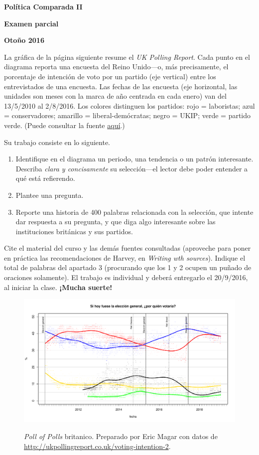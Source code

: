 \documentclass[letter,12pt]{article}
\begin{document}
\textbf{Política Comparada II}

\textbf{Examen parcial}

\textbf{Otoño 2016}

\bigskip

\noindent La gráfica de la página siguiente resume el \emph{UK Polling Report}. Cada punto en el diagrama reporta una encuesta del Reino Unido---o, más precisamente, el porcentaje de intención de voto por un partido (eje vertical) entre los entrevistados de una encuesta. Las fechas de las encuesta (eje horizontal, las unidades son meses con la marca de año centrada en cada enero) van del 13/5/2010 al 2/8/2016. Los colores distinguen los partidos: 
rojo = laboristas; 
azul = conservadores; 
amarillo = liberal-demócratas; 
negro = UKIP; 
verde = partido verde.
(Puede consultar la fuente \href{http://ukpollingreport.co.uk/voting-intention-2}{aquí}.)

\bigskip

\noindent Su trabajo consiste en lo siguiente. 

\begin{enumerate}
\item Identifique en el diagrama un periodo, una tendencia o un patrón interesante. Describa \emph{clara y concisamente} su selección---el lector debe poder entender a qué está refierendo.  
\item Plantee una pregunta.
\item Reporte una historia de 400 palabras relacionada con la selección, que intente dar respuesta a su pregunta, y que diga algo interesante sobre las instituciones británicas y sus partidos. 
\end{enumerate}

\bigskip

Cite el material del curso y las demás fuentes consultadas (aproveche para poner en práctica las recomendaciones de Harvey, en \emph{Writing wth sources}). Indique el total de palabras del apartado 3 (procurando que los 1 y 2 ocupen un puñado de oraciones solamente). El trabajo es individual y deberá entregarlo el 20/9/2016, al iniciar la clase. \textbf{¡Mucha suerte!}

\begin{figure}
\includegraphics[width=.9\columnwidth]{../data/uk/ukVoteIntentionsSince2010.pdf} \\
\caption{\emph{Poll of Polls} britanico. Preparado por Eric Magar con datos de \protect\url{http://ukpollingreport.co.uk/voting-intention-2}.}
\end{figure}  
\end{document}

